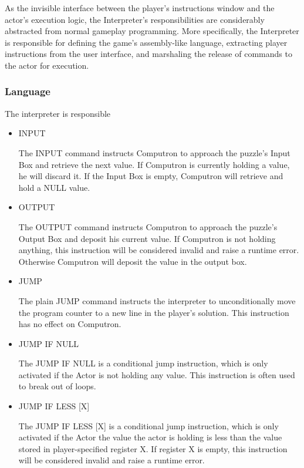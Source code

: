As the invisible interface between the player's instructions window and the actor's execution logic, the Interpreter's responsibilities are considerably abstracted from normal gameplay programming. More specifically, the Interpreter is responsible for defining the game's assembly-like language, extracting player instructions from the user interface, and marshaling the release of commands to the actor for execution.

\subsubsection{Language}
The interpreter is responsible

\begin{itemize}
    \item INPUT
    
    The INPUT command instructs Computron to approach the puzzle's Input Box and retrieve the next value. If Computron is currently holding a value, he will discard it. If the Input Box is empty, Computron will retrieve and hold a NULL value.

    \item OUTPUT
    
    The OUTPUT command instructs Computron to approach the puzzle's Output Box and deposit his current value. If Computron is not holding anything, this instruction will be considered invalid and raise a runtime error. Otherwise Computron will deposit the value in the output box.

    \item JUMP
    
    The plain JUMP command instructs the interpreter to unconditionally move the program counter to a new line in the player's solution. This instruction has no effect on Computron.

    \item JUMP IF NULL
    
    The JUMP IF NULL is a conditional jump instruction, which is only activated if the Actor is not holding any value. This instruction is often used to break out of loops.

    \item JUMP IF LESS [X]
    
    The JUMP IF LESS [X] is a conditional jump instruction, which is only activated if the Actor the value the actor is holding is less than the value stored in player-specified register X. If register X is empty, this instruction will be considered invalid and raise a runtime error.


\end{itemize}
